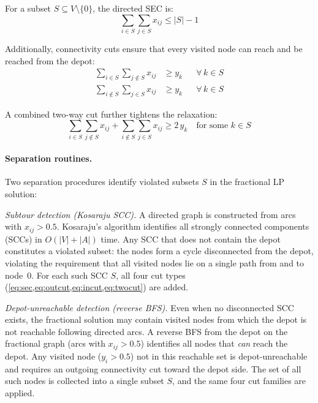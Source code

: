 \documentclass[11pt,a4paper]{article}
\begin{document}
For a subset $S \subseteq V \setminus \{0\}$, the directed SEC is:
\begin{equation}
  \sum_{i \in S} \sum_{j \in S} x_{ij} \leq |S| - 1
  \label{eq:sec}
\end{equation}

Additionally, connectivity cuts ensure that every visited node can reach and be reached from the depot:
\begin{align}
  \sum_{i \in S} \sum_{j \notin S} x_{ij} &\geq y_k && \forall\, k \in S \label{eq:outcut} \\
  \sum_{i \notin S} \sum_{j \in S} x_{ij} &\geq y_k && \forall\, k \in S \label{eq:incut}
\end{align}

A combined two-way cut further tightens the relaxation:
\begin{equation}
  \sum_{i \in S} \sum_{j \notin S} x_{ij} + \sum_{i \notin S} \sum_{j \in S} x_{ij} \geq 2\, y_k \quad \text{for some } k \in S
  \label{eq:twocut}
\end{equation}

\paragraph{Separation routines.}
Two separation procedures identify violated subsets $S$ in the fractional LP solution:

\emph{Subtour detection (Kosaraju SCC).}
A directed graph is constructed from arcs with $x_{ij} > 0.5$.
Kosaraju's algorithm identifies all strongly connected components (SCCs) in $O(|V| + |A|)$ time.
Any SCC that does not contain the depot constitutes a violated subset: the nodes form a cycle disconnected from the depot, violating the requirement that all visited nodes lie on a single path from and to node~0.
For each such SCC $S$, all four cut types (\cref{eq:sec,eq:outcut,eq:incut,eq:twocut}) are added.

\emph{Depot-unreachable detection (reverse BFS).}
Even when no disconnected SCC exists, the fractional solution may contain visited nodes from which the depot is not reachable following directed arcs.
A reverse BFS from the depot on the fractional graph (arcs with $x_{ij} > 0.5$) identifies all nodes that \emph{can} reach the depot.
Any visited node ($y_i > 0.5$) not in this reachable set is depot-unreachable and requires an outgoing connectivity cut toward the depot side.
The set of all such nodes is collected into a single subset $S$, and the same four cut families are applied.
\end{document}
